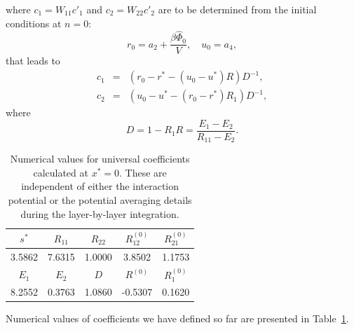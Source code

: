 where $c_1 = W_{11} c'_1$ and $c_2 = W_{22} c'_2$ are to be determined from the initial conditions at $n=0$:
\begin{equation*}
	r_0 = a_2 + \frac{\beta\hat{\Phi}_0}{V},
	\quad
	u_0 = a_4,
\end{equation*}
that leads to
\begin{eqnarray*}
	c_1 & = & (r_0 - r^* -(u_0 - u^*)R)D^{-1},
	\\
	c_2 & = &  (u_0 - u^* - (r_0 - r^*)R_1)D^{-1},
\end{eqnarray*}
where
\begin{equation*}
	D = 1 - R_1 R = \frac{E_1 - E_2}{R_{11} - E_2}.
\end{equation*}

\begin{table}[h]
	\noindent\caption{Numerical values for universal coefficients calculated at $x^* = 0$. These are independent of either the interaction potential or the potential averaging details during the layer-by-layer integration.}\vskip3mm
		\begin{tabular}{|c|c|c|c|c|}
			\hline
			$s^*$ & $R_{11}$ \quad & $R_{22}$ & $R_{12}^{(0)}$  & $R_{21}^{(0)}$\\
			\hline
			3.5862 & 7.6315  & 1.0000 & 3.8502 & 1.1753 \\
			\hline
			\hline
			$E_1$ & $E_2$ \quad & $D$ & $R^{(0)}$  & $R_1^{(0)}$\\
			\hline
			8.2552 & 0.3763  & 1.0860 & -0.5307 & 0.1620 \\
			\hline
		\end{tabular}
	\label{tab:num_coef}
\end{table}

Numerical values of coefficients we have defined so far are presented in Table~\ref{tab:num_coef}.

